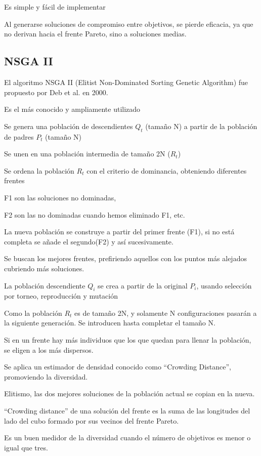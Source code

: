 \documentclass[12pt, twoside, openright]{report} %
\begin{document}
Es simple y fácil de implementar

Al generarse soluciones de compromiso entre objetivos, se pierde eficacia, ya que no derivan hacia el frente Pareto, sino a soluciones medias.

\subsection{NSGA II}
El algoritmo NSGA II (Elitist Non-Dominated Sorting Genetic Algorithm) fue propuesto por Deb et al. en 2000.

Es el más conocido y ampliamente utilizado

Se genera una población de descendientes $Q_t$ (tamaño N) a partir de la población de padres $P_t$ (tamaño N)

Se unen en una población intermedia de tamaño 2N ($R_t$)

Se ordena la población $R_t$ con el criterio de dominancia, obteniendo diferentes frentes

F1 son las soluciones no dominadas,

F2 son las no dominadas cuando hemos eliminado F1, etc.

La nueva población se construye a partir del primer frente (F1), si no está completa se añade el segundo(F2) y así sucesivamente.

Se buscan los mejores frentes, prefiriendo aquellos con los puntos más alejados cubriendo más soluciones.

La población descendiente $Q_i$ se crea a partir de la original $P_i$, usando selección por torneo, reproducción y mutación

Como la población $R_t$ es de tamaño 2N, y solamente N configuraciones pasarán a la siguiente generación. Se introducen hasta completar el tamaño N.

Si en un frente hay más individuos que los que quedan para llenar la población, se eligen a los más dispersos.

Se aplica un estimador de densidad conocido como “Crowding Distance”, promoviendo la diversidad.

Elitismo, las dos mejores soluciones de la población actual se copian en la nueva.

“Crowding distance” de una solución del frente es la suma de las longitudes del lado del cubo formado por sus vecinos del frente Pareto.

Es un buen medidor de la diversidad cuando el número de objetivos es menor o igual que tres.
\end{document}
